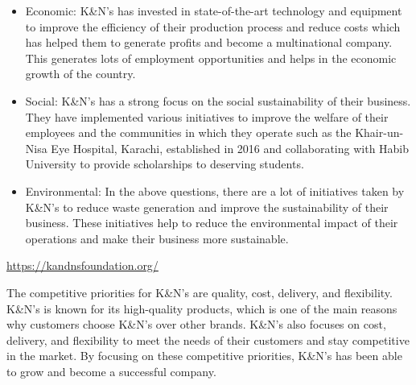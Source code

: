 \documentclass[a4paper]{exam}
\begin{document}
\begin{questions}
        \begin{solution}
            \begin{itemize}
                \item Economic: K\&N's has invested in state-of-the-art technology and equipment to improve the efficiency of their production process and reduce costs which has helped them to generate profits and become a multinational company. This generates lots of employment opportunities and helps in the economic growth of the country.
                \item Social: K\&N's has a strong focus on the social sustainability of their business. They have implemented various initiatives to improve the welfare of their employees and the communities in which they operate such as the Khair-un-Nisa Eye Hospital, Karachi, established in 2016 and collaborating with Habib University to provide scholarships to deserving students.
                \item Environmental: In the above questions, there are a lot of initiatives taken by K\&N's to reduce waste generation and improve the sustainability of their business. These initiatives help to reduce the environmental impact of their operations and make their business more sustainable.
            \end{itemize}
            \begin{thebibliography}{9}
                \url{https://kandnsfoundation.org/}
            \end{thebibliography}
        \end{solution}

        \begin{solution}
            The competitive priorities for K\&N's are quality, cost, delivery, and flexibility. K\&N's is known for its high-quality products, which is one of the main reasons why customers choose K\&N's over other brands. K\&N's also focuses on cost, delivery, and flexibility to meet the needs of their customers and stay competitive in the market. By focusing on these competitive priorities, K\&N's has been able to grow and become a successful company.
        \end{solution}
    \end{questions}    
\end{document}
